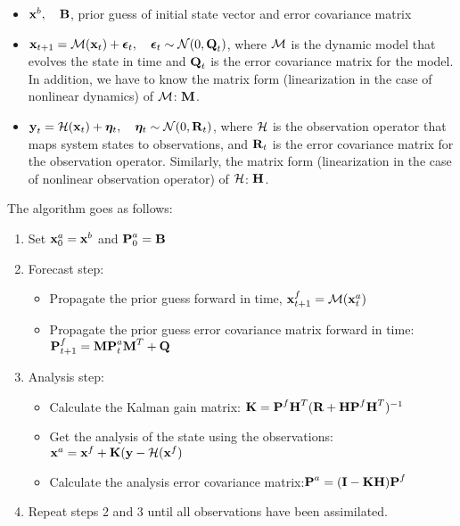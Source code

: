 \begin{itemize}
    \item $\textbf{x}^b,\quad \textbf{B}$, prior guess of initial state vector and error covariance matrix
    \item $\textbf{x}_{t+1}=\mathcal{M}(\textbf{x}_{t}) + \bm{\epsilon}_t,\quad \bm{\epsilon}_t\sim\mathcal{N}(0,\textbf{Q}_t)$, where $\mathcal{M}$ is the dynamic model that evolves the state in time and $\textbf{Q}_t$ is the error covariance matrix for the model. In addition, we have to know the matrix form (linearization in the case of nonlinear dynamics) of $\mathcal{M}$: $\textbf{M}$.
    \item $\textbf{y}_t = \mathcal{H}(\textbf{x}_t) + \bm{\eta}_t,\quad \bm{\eta}_t\sim\mathcal{N}(0,\textbf{R}_t)$, where $\mathcal{H}$ is the observation operator that maps system states to observations, and $\textbf{R}_t$ is the error covariance matrix for the observation operator. Similarly, the matrix form (linearization in the case of nonlinear observation operator) of $\mathcal{H}$: $\textbf{H}$.
\end{itemize}

The algorithm goes as follows:
\begin{enumerate}
    \item Set $\textbf{x}_0^a=\textbf{x}^b$ and $\textbf{P}_0^a=\textbf{B}$
    \item Forecast step:
    \begin{itemize}
        \item Propagate the prior guess forward in time, $\textbf{x}_{t+1}^f=\mathcal{M}(\textbf{x}_t^a)$
        \item Propagate the prior guess error covariance matrix forward in time: $\textbf{P}_{t+1}^f=\textbf{M}\textbf{P}_t^a\textbf{M}^T+\textbf{Q}$
    \end{itemize}
    \item Analysis step:
    \begin{itemize}
        \item Calculate the Kalman gain matrix: $\textbf{K} = \textbf{P}^f\textbf{H}^T(\textbf{R} + \textbf{H}\textbf{P}^f\textbf{H}^T)^{-1}$
        \item Get the analysis of the state using the observations: $\textbf{x}^a=\textbf{x}^f + \textbf{K}(\textbf{y} - \mathcal{H}(\textbf{x}^f)$
        \item Calculate the analysis error covariance matrix:$\textbf{P}^a = (\textbf{I} - \textbf{K}\textbf{H})\textbf{P}^f$
    \end{itemize}
    \item Repeat steps 2 and 3 until all observations have been assimilated.
\end{enumerate}


